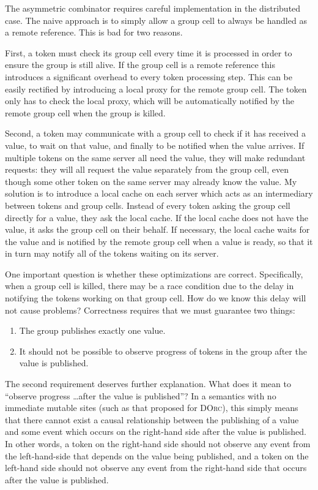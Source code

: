 \documentclass[10pt,letterpaper]{article}
\begin{document}
The asymmetric combinator requires careful implementation in the distributed
case. The naive approach is to simply allow a group cell to always be handled
as a remote reference. This is bad for two reasons.

First, a token must check its group cell every time it is processed in order to
ensure the group is still alive. If the group cell is a remote reference this
introduces a significant overhead to every token processing step. This can be
easily rectified by introducing a local proxy for the remote group cell. The
token only has to check the local proxy, which will be automatically notified
by the remote group cell when the group is killed.

Second, a token may communicate with a group cell to check if it has received a
value, to wait on that value, and finally to be notified when the value
arrives. If multiple tokens on the same server all need the value, they will
make redundant requests: they will all request the value separately from the
group cell, even though some other token on the same server may already know
the value. My solution is to introduce a local cache on each server which acts
as an intermediary between tokens and group cells. Instead of every token
asking the group cell directly for a value, they ask the local cache. If the
local cache does not have the value, it asks the group cell on their behalf.
If necessary, the local cache waits for the value and is notified by the remote
group cell when a value is ready, so that it in turn may notify all of the
tokens waiting on its server.

One important question is whether these optimizations are correct.
Specifically, when a group cell is killed, there may be a race condition due to
the delay in notifying the tokens working on that group cell. How do we know
this delay will not cause problems?  Correctness requires that we must
guarantee two things:
\begin{enumerate}
\item The group publishes exactly one value.
\item It should not be possible to observe progress of tokens in the group
after the value is published.
\end{enumerate}

The second requirement deserves further explanation. What does it mean to
``observe progress \ldots after the value is published''? In a semantics with
no immediate mutable sites (such as that proposed for \textsc{DOrc}), this
simply means that there cannot exist a causal relationship between the
publishing of a value and some event which occurs on the right-hand side after
the value is published. In other words, a token on the right-hand side should
not observe any event from the left-hand-side that depends on the value being
published, and a token on the left-hand side should not observe any event from
the right-hand side that occurs after the value is published.
\end{document}
